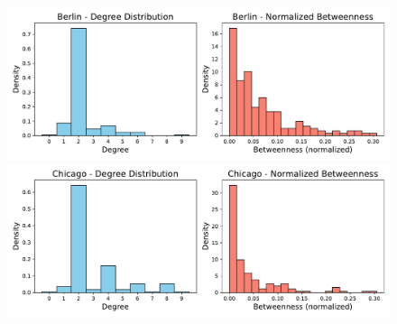 \begin{figure}[hbtp]
    \centering
    \begin{minipage}{0.48\linewidth}
        \centering
        \includegraphics[width=\linewidth]{figures/task40_plots/deg_bet_Berlin.pdf}
        \end{minipage}%
    \hfill
    \begin{minipage}{0.48\linewidth}
        \centering
        \includegraphics[width=\linewidth]{figures/task40_plots/deg_bet_Chicago.pdf}
    \end{minipage}
\end{figure}

